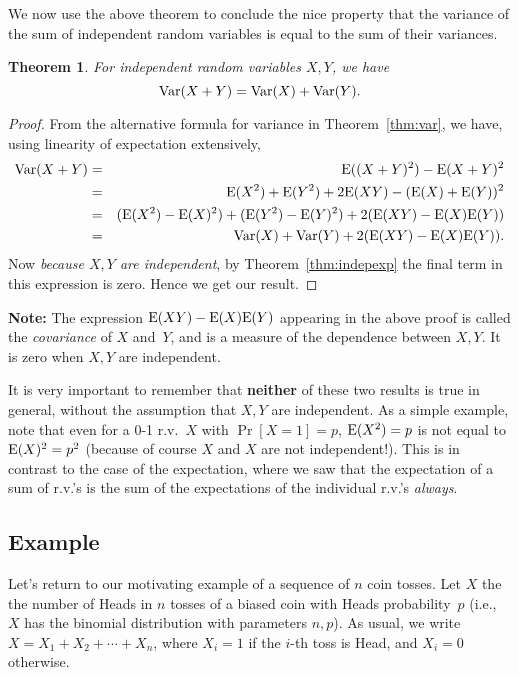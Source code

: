 \documentclass[11pt]{article}
\def\Ex#1{{\rm E}(#1)}
\def\Var#1{{\rm Var}(#1)}
\newcounter{thm}
\newtheorem{theorem}{Theorem}[thm]
\begin{document}
We now use the above theorem to conclude the nice property that the variance of
the sum of independent random variables is equal to the sum of their variances.

\begin{theorem}\label{thm:varsum}
For {\em independent} random variables $X,Y$, we have $$
   \Var{X+Y} = \Var{X} + \Var{Y}.  $$
\end{theorem}
\begin{proof}
From the alternative formula for variance in Theorem~\ref{thm:var}, we have, using linearity
of expectation extensively,
\begin{eqnarray*}
   \Var{X+Y} &=& \Ex{(X+Y)^2} - \Ex{X+Y}^2\\
                      &=& \Ex{X^2}+\Ex{Y^2}+2\Ex{XY} - (\Ex{X}+\Ex{Y})^2\\
                      &=& (\Ex{X^2}-\Ex{X}^2) + (\Ex{Y^2}-\Ex{Y}^2) + 2(\Ex{XY}-\Ex{X}\Ex{Y})\\
                      &=& \Var{X} + \Var{Y} + 2(\Ex{XY}-\Ex{X}\Ex{Y}).
\end{eqnarray*}
Now {\it because $X,Y$ are independent}, by Theorem~\ref{thm:indepexp} the final
term in this expression is zero.  Hence we get our result.
\end{proof}

{\bf Note:} The expression $\Ex{XY}-\Ex{X}\Ex{Y}$ appearing in the above proof
is called the {\it covariance\/} of $X$ and~$Y$, and is a measure of the dependence between
$X,Y$.  It is zero when $X,Y$ are independent.

It is very important to remember that {\bf neither} of these two results is true in general, without the assumption
that $X,Y$ are independent.  As a simple example, note that even for
a 0-1 r.v.~$X$ with $\Pr[X=1]=p$, $\Ex{X^2}=p$ is not equal to
$\Ex{X}^2=p^2$ (because of course $X$ and $X$ are not independent!).
This is in contrast to the case of the expectation, where we saw that the expectation of a sum 
of r.v.'s is the sum of the expectations of the individual r.v.'s {\em always}. 

\subsection*{Example}
Let's return to our motivating example of a sequence of $n$ coin tosses.
Let $X$ the the number of Heads in $n$ tosses
of a biased coin with Heads probability~$p$ (i.e., $X$ has the binomial
distribution with parameters $n,p$).  As usual, we write $X=X_1+X_2+\cdots +X_n$, where
$X_i=1$ if the $i$-th toss is Head, and $X_i = 0$ otherwise.
\end{document}
